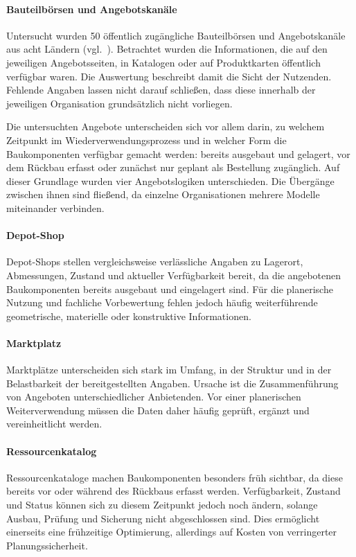 \documentclass[type=zwischenbericht]{zukunftbau}
\begin{document}
\begin{SemioNest}
\paragraph{Bauteilbörsen und Angebotskanäle}
Untersucht wurden 50 öffentlich zugängliche Bauteilbörsen und Angebotskanäle aus acht Ländern (vgl.\ ). Betrachtet wurden die Informationen, die auf den jeweiligen Angebotsseiten, in Katalogen oder auf Produktkarten öffentlich verfügbar waren. Die Auswertung beschreibt damit die Sicht der Nutzenden. Fehlende Angaben lassen nicht darauf schließen, dass diese innerhalb der jeweiligen Organisation grundsätzlich nicht vorliegen.

Die untersuchten Angebote unterscheiden sich vor allem darin, zu welchem Zeitpunkt im Wiederverwendungsprozess und in welcher Form die Baukomponenten verfügbar gemacht werden: bereits ausgebaut und gelagert, vor dem Rückbau erfasst oder zunächst nur geplant als Bestellung zugänglich. Auf dieser Grundlage wurden vier Angebotslogiken unterschieden. Die Übergänge zwischen ihnen sind fließend, da einzelne Organisationen mehrere Modelle miteinander verbinden.

\begin{SemioNest}
\paragraph{Depot-Shop}
Depot-Shops stellen vergleichsweise verlässliche Angaben zu Lagerort, Abmessungen, Zustand und aktueller Verfügbarkeit bereit, da die angebotenen Baukomponenten bereits ausgebaut und eingelagert sind. Für die planerische Nutzung und fachliche \Gls{Vorbewertung} fehlen jedoch häufig weiterführende geometrische, materielle oder konstruktive Informationen.

\paragraph{Marktplatz}
Marktplätze unterscheiden sich stark im Umfang, in der Struktur und in der Belastbarkeit der bereitgestellten Angaben. Ursache ist die Zusammenführung von Angeboten unterschiedlicher Anbietenden. Vor einer planerischen Weiterverwendung müssen die Daten daher häufig geprüft, ergänzt und vereinheitlicht werden.

\paragraph{Ressourcenkatalog}
Ressourcenkataloge machen Baukomponenten besonders früh sichtbar, da diese bereits vor oder während des Rückbaus erfasst werden. Verfügbarkeit, Zustand und Status können sich zu diesem Zeitpunkt jedoch noch ändern, solange Ausbau, Prüfung und Sicherung nicht abgeschlossen sind. Dies ermöglicht einerseits eine frühzeitige Optimierung, allerdings auf Kosten von verringerter Planungssicherheit.


\end{SemioNest}
\end{SemioNest}
\end{document}
